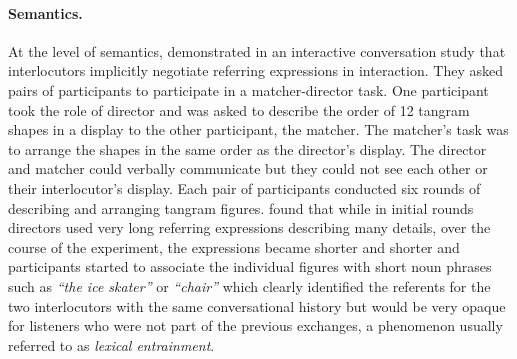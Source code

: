 \paragraph{Semantics.} At the level of semantics, \textcite{Clark1986} demonstrated in an interactive conversation study that interlocutors 
implicitly negotiate referring expressions in interaction. They asked pairs of participants to participate in a matcher-director task. One participant
took the role of director and was asked to describe the order of 12 tangram shapes in a display to the other participant, the matcher. The matcher's task was
to arrange the shapes in the same order as the director's display. The director and matcher could verbally communicate but they could not see each other or 
their interlocutor's display. Each pair of participants conducted six rounds of describing and arranging tangram figures. \textcite{Clark1986} found that 
while in initial rounds directors used very long referring expressions describing many details, over the course of the experiment, the expressions became shorter and
shorter and participants started to associate the individual figures with short noun phrases such as \textit{``the ice skater''} or \textit{``chair''} which clearly identified 
the referents for the two interlocutors with the same conversational history but would be very opaque for listeners who were not part of the previous exchanges, a
phenomenon usually referred to as \textit{lexical entrainment}. 

